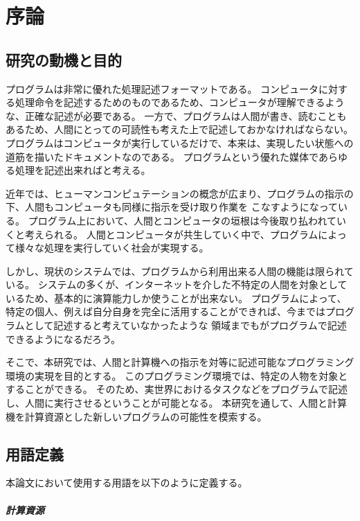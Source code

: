 \chapter{序論}\label{chap:introduction}

\section{研究の動機と目的}\label{ux7814ux7a76ux306eux52d5ux6a5fux3068ux76eeux7684}

プログラムは非常に優れた処理記述フォーマットである。
コンピュータに対する処理命令を記述するためのものであるため、コンピュータが理解できるような、正確な記述が必要である。
一方で、プログラムは人間が書き、読むこともあるため、人間にとっての可読性も考えた上で記述しておかなければならない。
プログラムはコンピュータが実行しているだけで、本来は、実現したい状態への道筋を描いたドキュメントなのである。
プログラムという優れた媒体であらゆる処理を記述出来ればと考える。

近年では、ヒューマンコンピュテーションの概念が広まり、プログラムの指示の下、人間もコンピュータも同様に指示を受け取り作業を
こなすようになっている。
プログラム上において、人間とコンピュータの垣根は今後取り払われていくと考えられる。
人間とコンピュータが共生していく中で、プログラムによって様々な処理を実行していく社会が実現する。

しかし、現状のシステムでは、プログラムから利用出来る人間の機能は限られている。
システムの多くが、インターネットを介した不特定の人間を対象としているため、基本的に演算能力しか使うことが出来ない。
プログラムによって、特定の個人、例えば自分自身を完全に活用することができれば、今まではプログラムとして記述すると考えていなかったような
領域までもがプログラムで記述できるようになるだろう。

そこで、本研究では、人間と計算機への指示を対等に記述可能なプログラミング環境の実現を目的とする。
このプログラミング環境では、特定の人物を対象とすることができる。
そのため、実世界におけるタスクなどをプログラムで記述し、人間に実行させるということが可能となる。
本研究を通して、人間と計算機を計算資源とした新しいプログラムの可能性を模索する。

\section{用語定義}\label{ux7528ux8a9eux5b9aux7fa9}

本論文において使用する用語を以下のように定義する。

\paragraph{計算資源}\label{ux8a08ux7b97ux8cc7ux6e90}

